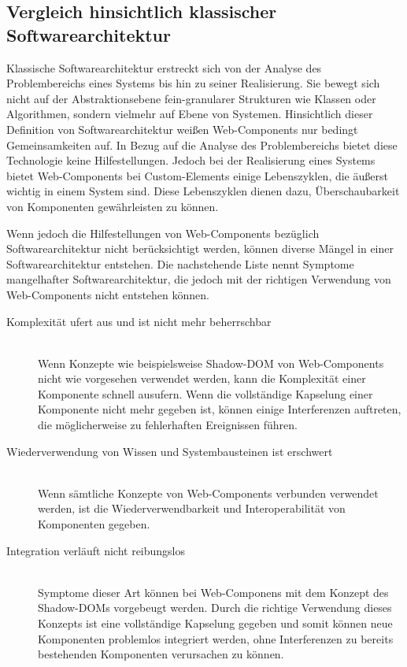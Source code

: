 \subsection{Vergleich hinsichtlich klassischer Softwarearchitektur}
\label{sec:5_Vergleich_Architektur}

Klassische Softwarearchitektur erstreckt sich von der Analyse des Problembereichs eines Systems bis hin zu seiner Realisierung. Sie bewegt sich nicht auf der Abstraktionsebene fein-granularer Strukturen wie Klassen oder Algorithmen, sondern vielmehr auf Ebene von Systemen. Hinsichtlich dieser Definition von Softwarearchitektur weißen Web-Components nur bedingt Gemeinsamkeiten auf. In Bezug auf die Analyse des Problembereichs bietet diese Technologie keine Hilfestellungen. Jedoch bei der Realisierung eines Systems bietet Web-Components bei Custom-Elements einige Lebenszyklen, die äußerst wichtig in einem System sind. Diese Lebenszyklen dienen dazu, Überschaubarkeit von Komponenten gewährleisten zu können.

Wenn jedoch die Hilfestellungen von Web-Components bezüglich Softwarearchitektur nicht berücksichtigt werden, können diverse Mängel in einer Softwarearchitektur entstehen. Die nachstehende Liste nennt Symptome mangelhafter Softwarearchitektur, die jedoch mit der richtigen Verwendung von Web-Components nicht entstehen können.

\begin{description}
\item[Komplexität ufert aus und ist nicht mehr beherrschbar] \hfill \\
Wenn Konzepte wie beispielsweise Shadow-DOM von Web-Components nicht wie vorgesehen verwendet werden, kann die Komplexität einer Komponente schnell ausufern. Wenn die vollständige Kapselung einer Komponente nicht mehr gegeben ist, können einige Interferenzen auftreten, die möglicherweise zu fehlerhaften Ereignissen führen.

\item[Wiederverwendung von Wissen und Systembausteinen ist erschwert] \hfill \\
Wenn sämtliche Konzepte von Web-Components verbunden verwendet werden, ist die Wiederverwendbarkeit und Interoperabilität von Komponenten gegeben.

\item[Integration verläuft nicht reibungslos] \hfill \\
Symptome dieser Art können bei Web-Componens mit dem Konzept des Shadow-DOMs vorgebeugt werden. Durch die richtige Verwendung dieses Konzepts ist eine vollständige Kapselung gegeben und somit können neue Komponenten problemlos integriert werden, ohne Interferenzen zu bereits bestehenden Komponenten verursachen zu können.
\end{description}

